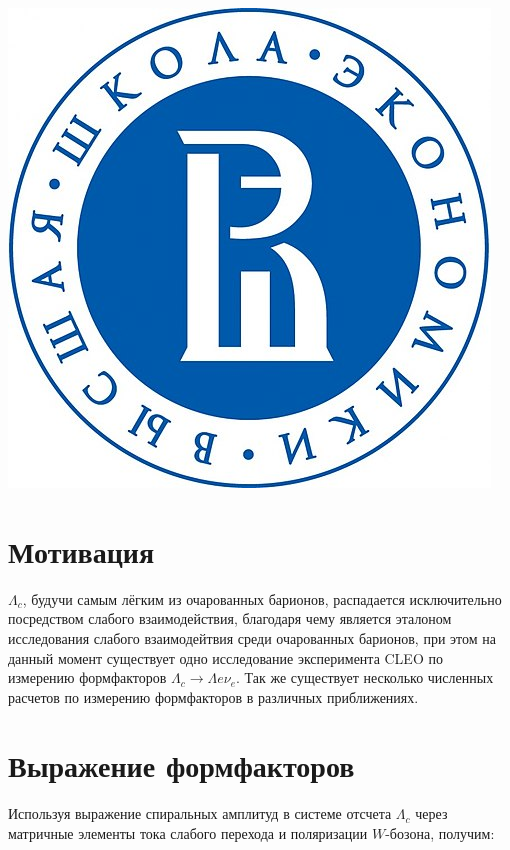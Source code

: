 \documentclass[a0,portrait]{a0poster}
\newcommand\tab[1][0.51cm]{\hspace*{#1}}
\begin{document}
\begin{mdframed}[style=MyFrame]
\begin{minipage}[b]{0.1\linewidth}
        \includegraphics[width=1\linewidth]{img/logo_hse_cmyk.jpg}
    \end{minipage}
\vspace{0.5cm}

\begin{multicols}{2}

\section{Мотивация}

\tab $\Lambda_c$, будучи самым лёгким из очарованных барионов, распадается 
исключительно посредством слабого взаимодействия, благодаря чему является 
эталоном исследования слабого взаимодейтвия среди очарованных барионов, 
при этом на данный момент существует одно исследование эксперимента CLEO по 
измерению формфакторов $\Lambda_c \to \Lambda e \nu_e$. Так же существует 
несколько численных расчетов по измерению формфакторов в различных приближениях.

\section{Выражение формфакторов}

\tab Используя выражение спиральных амплитуд в системе отсчета $\Lambda_c$ 
через матричные элементы тока слабого перехода и поляризации $W$-бозона, получим:


\end{multicols}
\end{mdframed}
\end{document}
